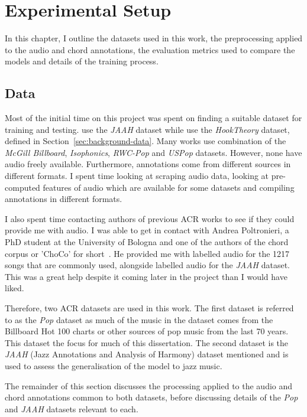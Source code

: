 \chapter{Experimental Setup}

In this chapter, I outline the datasets used in this work, the preprocessing applied to the audio and chord annotations, the evaluation metrics used to compare the models and details of the training process.

\section{Data}

Most of the initial time on this project was spent on finding a suitable dataset for training and testing. \citet{JAAH} use the \emph{JAAH} dataset while \citet{MelodyTranscriptionViaGenerativePreTraining} use the \emph{HookTheory} dataset, defined in Section~\ref{sec:background-data}. Many works use combination of the \emph{McGill Billboard}, \emph{Isophonics}, \emph{RWC-Pop} and \emph{USPop} datasets. However, none have audio freely available. Furthermore, annotations come from different sources in different formats. I spent time looking at scraping audio data, looking at pre-computed features of audio which are available for some datasets and compiling annotations in different formats.

I also spent time contacting authors of previous ACR works to see if they could provide me with audio. I was able to get in contact with Andrea Poltronieri, a PhD student at the University of Bologna and one of the authors of the chord corpus or 'ChoCo' for short~\citep{Choco}. He provided me with labelled audio for the 1217 songs that are commonly used, alongside labelled audio for the \emph{JAAH} dataset. This was a great help despite it coming later in the project than I would have liked.

Therefore, two ACR datasets are used in this work. The first dataset is referred to as the \emph{Pop} dataset as much of the music in the dataset comes from the Billboard Hot 100 charts or other sources of pop music from the last 70 years. This dataset the focus for much of this dissertation. The second dataset is the \emph{JAAH} (Jazz Annotations and Analysis of Harmony) dataset mentioned and is used to assess the generalisation of the model to jazz music. 

The remainder of this section discusses the processing applied to the audio and chord annotations common to both datasets, before discussing details of the \emph{Pop} and \emph{JAAH} datasets relevant to each.

